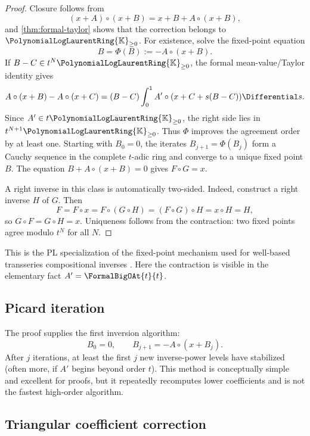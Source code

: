 \documentclass[11pt,oneside]{article}
\numberwithin{equation}{section}
\theoremstyle{definition}
\newcommand{\K}{\mathbb{K}}
\newcommand{\PL}{\PolynomialLogLaurentRing{\K}}
\begin{document}
\begin{proof}
Closure follows from
\[
  (x+A)\circ(x+B)=x+B+A\circ(x+B),
\]
and \cref{thm:formal-taylor} shows that the correction belongs to
\({\PL}_{\ge0}\).  For existence, solve the fixed-point equation
\begin{equation}\label{eq:fixed-point-B}
  B=\Phi(B):=-A\circ(x+B).
\end{equation}
If \(B-C\in t^N{\PL}_{\ge0}\), the formal mean-value/Taylor identity gives
\[
  A\circ(x+B)-A\circ(x+C)
  =(B-C)\int_0^1 A'\circ(x+C+s(B-C))\Differential s.
\]
Since \(A'\in t{\PL}_{\ge0}\), the right side lies in
\(t^{N+1}{\PL}_{\ge0}\).  Thus \(\Phi\) improves the agreement order by at least
one.  Starting with \(B_0=0\), the iterates
\(B_{j+1}=\Phi(B_j)\) form a Cauchy sequence in the complete \(t\)-adic ring and
converge to a unique fixed point \(B\).  The equation
\(B+A\circ(x+B)=0\) gives \(F\circ G=x\).

A right inverse in this class is automatically two-sided.  Indeed, construct a
right inverse \(H\) of \(G\).  Then
\[
  F=F\circ x=F\circ(G\circ H)=(F\circ G)\circ H=x\circ H=H,
\]
so \(G\circ F=G\circ H=x\).  Uniqueness follows from the contraction: two fixed
points agree modulo \(t^N\) for all \(N\).
\end{proof}

This is the PL specialization of the fixed-point mechanism used for
well-based transseries compositional inverses \cite{EdgarComposition}.  Here the
contraction is visible in the elementary fact \(A'=\FormalBigOAt{t}{t}\).

\subsection{Picard iteration}

The proof supplies the first inversion algorithm:
\begin{equation}\label{eq:picard-reversion}
  B_0=0,
  \qquad B_{j+1}=-A\circ(x+B_j).
\end{equation}
After \(j\) iterations, at least the first \(j\) new inverse-power levels have
stabilized (often more, if \(A'\) begins beyond order \(t\)).  This method is
conceptually simple and excellent for proofs, but it repeatedly recomputes lower
coefficients and is not the fastest high-order algorithm.

\subsection{Triangular coefficient correction}
\end{document}
